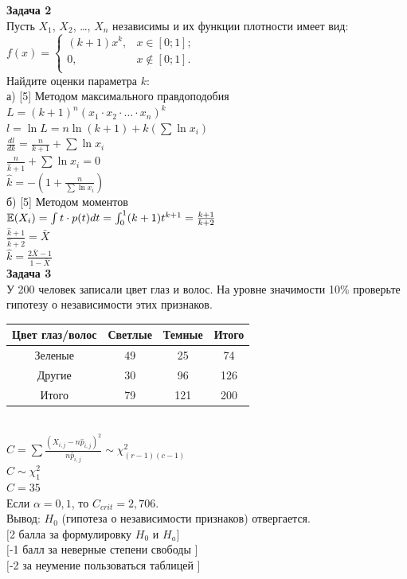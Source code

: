 \documentclass[12pt, a4paper]{article}\usepackage[]{graphicx}\usepackage[]{color}
\begin{document}
{\bf Задача 2} \\
Пусть $X_{1}$, $X_{2}$, \ldots, $X_{n}$ независимы и их функции
плотности имеет вид: \\
$ f(x)=
\left\{%
\begin{array}{ll}
    (k+1)x^{k}, & x \in [0;1]; \\
    0, & x \notin [0;1]. \\
\end{array}%
\right.     $ \\
Найдите оценки параметра $k$: \\
а) [5] Методом максимального правдоподобия \\
$L=(k+1)^{n}(x_{1}\cdot x_{2} \cdot\ldots\cdot x_{n})^{k}$ \\
$l=\ln{L}=n\ln(k+1)+k(\sum \ln{x_{i}})$ \\
$\frac{dl}{dk}=\frac{n}{k+1}+\sum \ln{x_{i}}$ \\
$\frac{n}{\hat{k}+1}+\sum \ln{x_{i}}=0$ \\
$\hat{k}=-\left(1+\frac{n}{\sum \ln{x_{i}}} \right)$ \\
б) [5] Методом моментов \\
$\mathbb{E}(X_{i})=\int t\cdot p(t)dt=\int_{0}^{1}
(k+1)t^{k+1}=\frac{k+1}{k+2}$ \\
$\frac{\hat{k}+1}{\hat{k}+2}=\bar{X}$ \\
$\hat{k}=\frac{2\bar{X}-1}{1-\bar{X}}$ \\


{\bf Задача 3} \\
У 200 человек записали цвет глаз и волос. На уровне значимости
10\% проверьте гипотезу о независимости этих признаков. \\
\begin{tabular}{|c|c|c|c|}
  \hline
  Цвет глаз/волос & Светлые & Темные & Итого \\
  \hline
  Зеленые & 49 & 25 & 74 \\
  Другие & 30 & 96 & 126 \\
  \hline
  Итого & 79 & 121 & 200 \\
  \hline
\end{tabular} \\
$C=\sum \frac{(X_{i,j}-n \hat{p}_{i,j})^{2}}{n\hat{p}_{i,j}}\sim
\chi_{(r-1)(c-1)}^{2}$ \\
$C\sim \chi_{1}^{2}$ \\
$C=35$ \\
Если $\alpha=0,1$, то $C_{crit}=2,706$. \\
Вывод: $H_{0}$ (гипотеза о независимости признаков) отвергается. \\
$[$2 балла за формулировку $H_{0}$ и $H_{a}]$ \\
$[$-1 балл за неверные степени свободы $]$ \\
$[$-2 за неумение пользоваться таблицей $]$ \\
\end{document}
